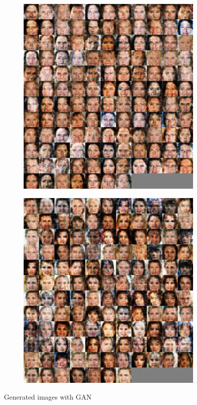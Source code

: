 \documentclass{article} %
\begin{document}
    \begin{figure}[H]
\centering
\begin{subfigure}{.5\textwidth}
\centering
\includegraphics[width=.6\linewidth]{GAN1.png}
\end{subfigure}%
\begin{subfigure}{.5\textwidth}
\centering
\includegraphics[width=.6\linewidth]{GAN2.png}
\end{subfigure}
\caption{Generated images with GAN}
\end{figure}
\end{document}
